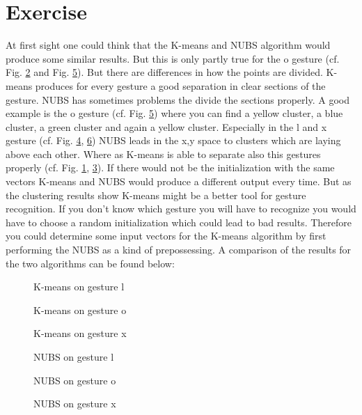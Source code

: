 \documentclass[conference]{IEEEtran}
\begin{document}
\section{Exercise}
At first sight one could think that the K-means and NUBS algorithm would produce some similar results. But this is only partly true for the o gesture (cf. Fig. \ref{fig:kmean_o} and Fig. \ref{fig:nubs_o}). But there are differences in how the points are divided. K-means produces for every gesture a good separation in clear sections of the gesture. NUBS has sometimes problems the divide the sections properly. A good example is the o gesture (cf. Fig. \ref{fig:nubs_o}) where you can find a yellow cluster, a blue cluster, a green cluster and again a yellow cluster. Especially in the l and x gesture (cf. Fig. \ref{fig:nubs_l}, \ref{fig:nubs_x}) NUBS leads in the x,y space to clusters which are laying above each other. Where as K-means is able to separate also this gestures properly (cf. Fig. \ref{fig:kmean_l}, \ref{fig:kmean_x}). If there would not be the initialization with the same vectors K-means and NUBS would produce a different output every time. But as the clustering results show K-means might be a better tool for gesture recognition. If you don't know which gesture you will have to recognize you would have to choose a random initialization which could lead to bad results. Therefore you could determine some input vectors for the K-means algorithm by first performing the NUBS as a kind of prepossessing. A comparison of the results for the two algorithms can be found below:


\begin{figure}[h!]
  	\centering
    \scalebox{.47}{}
    \caption{K-means on gesture l}
    \label{fig:kmean_l}
\end{figure}
\vspace{-10pt}
\begin{figure}[h!]
  	\centering
    \scalebox{.47}{}
    \caption{K-means on gesture o}
    \label{fig:kmean_o}
\end{figure}
\vspace{-10pt}
\begin{figure}[h!]
  	\centering
    \scalebox{.47}{}
    \caption{K-means on gesture x}
    \label{fig:kmean_x}
\end{figure}
\vspace{-20pt}
\begin{figure}[h!]
  	\centering
    \scalebox{.47}{}
    \caption{NUBS on gesture l}
    \label{fig:nubs_l}
\end{figure}
\vspace{-20pt}
\begin{figure}[h!]
  	\centering
    \scalebox{.47}{}
    \caption{NUBS on gesture o}
    \label{fig:nubs_o}
\end{figure}
\vspace{-20pt}
\begin{figure}[h!]
  	\centering
    \scalebox{.47}{}
    \caption{NUBS on gesture x}
    \label{fig:nubs_x}
\end{figure}
\end{document}
